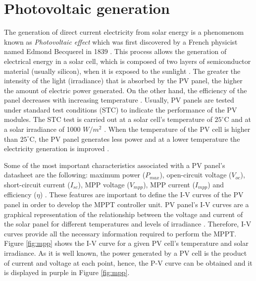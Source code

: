 \section{Photovoltaic generation}

The generation of direct current electricity from solar energy is a phenomenom known as \textit{Photovoltaic effect} which was first discovered by a French physicist named Edmond Becquerel in 1839 \cite{PVeffect}. This process allows the generation of electrical energy in a solar cell, which is composed of two layers of semiconductor material (usually silicon), when it is exposed to the sunlight \cite{PVeffect}. The greater the intensity of the light (irradiance) that is absorbed by the PV panel, the higher the amount of electric power generated. On the other hand, the efficiency of the panel decreases with increasing temperature \cite{handbook}. Usually, PV panels are tested under standard test conditions (STC) to indicate the performance of the PV modules. The STC test is carried out at a solar cell's temperature of $25^\circ$C and at a solar irradiance of 1000 $W/ m^2$ \cite{handbook}. When the temperature of the PV cell is higher than $25^\circ$C, the PV panel generates less power and at a lower temperature the electricity generation is improved \cite{handbook}. %


Some of the most important characteristics associated with a PV panel’s datasheet are the following: maximum power ($P_{max}$), open-circuit voltage ($V_{oc}$), short-circuit current ($I_{sc}$), MPP voltage ($V_{mpp}$), MPP current ($I_{mpp}$) and efficiency ($\eta$) \cite{handbook}.  %
These features are important to define the I-V curves of the PV panel in order to develop the MPPT controller unit. PV panel's I-V curves are a graphical representation of the relationship between the voltage and current of the solar panel for different temperatures and levels of irradiance \cite{IVcurves}. Therefore, I-V curves provide all the necessary information required to perform the MPPT. Figure \ref{fig:mpp} shows the I-V curve for a given PV cell's temperature and solar irradiance. As it is well known, the power generated by a PV cell is the product of current and voltage at each point, hence, the P-V curve can be obtained and it is displayed in purple in Figure \ref{fig:mpp}.  %

